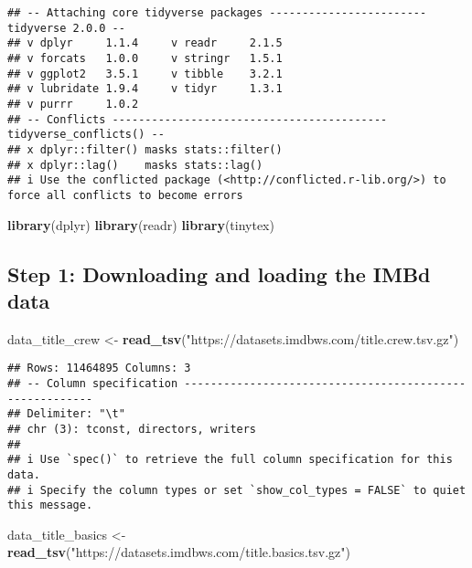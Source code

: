 \documentclass[
]{article}
\newenvironment{Shaded}{\begin{snugshade}}{\end{snugshade}}
\newcommand{\FunctionTok}[1]{\textcolor[rgb]{0.13,0.29,0.53}{\textbf{#1}}}
\newcommand{\NormalTok}[1]{#1}
\newcommand{\OtherTok}[1]{\textcolor[rgb]{0.56,0.35,0.01}{#1}}
\newcommand{\StringTok}[1]{\textcolor[rgb]{0.31,0.60,0.02}{#1}}
\begin{document}
\begin{verbatim}
## -- Attaching core tidyverse packages ------------------------ tidyverse 2.0.0 --
## v dplyr     1.1.4     v readr     2.1.5
## v forcats   1.0.0     v stringr   1.5.1
## v ggplot2   3.5.1     v tibble    3.2.1
## v lubridate 1.9.4     v tidyr     1.3.1
## v purrr     1.0.2     
## -- Conflicts ------------------------------------------ tidyverse_conflicts() --
## x dplyr::filter() masks stats::filter()
## x dplyr::lag()    masks stats::lag()
## i Use the conflicted package (<http://conflicted.r-lib.org/>) to force all conflicts to become errors
\end{verbatim}

\begin{Shaded}
\begin{Highlighting}[]
\FunctionTok{library}\NormalTok{(dplyr)}
\FunctionTok{library}\NormalTok{(readr)}
\FunctionTok{library}\NormalTok{(tinytex)}
\end{Highlighting}
\end{Shaded}

\subsection{Step 1: Downloading and loading the IMBd
data}\label{step-1-downloading-and-loading-the-imbd-data}

\begin{Shaded}
\begin{Highlighting}[]
\NormalTok{data\_title\_crew }\OtherTok{\textless{}{-}} \FunctionTok{read\_tsv}\NormalTok{(}\StringTok{"https://datasets.imdbws.com/title.crew.tsv.gz"}\NormalTok{)}
\end{Highlighting}
\end{Shaded}

\begin{verbatim}
## Rows: 11464895 Columns: 3
## -- Column specification --------------------------------------------------------
## Delimiter: "\t"
## chr (3): tconst, directors, writers
## 
## i Use `spec()` to retrieve the full column specification for this data.
## i Specify the column types or set `show_col_types = FALSE` to quiet this message.
\end{verbatim}

\begin{Shaded}
\begin{Highlighting}[]
\NormalTok{data\_title\_basics }\OtherTok{\textless{}{-}} \FunctionTok{read\_tsv}\NormalTok{(}\StringTok{"https://datasets.imdbws.com/title.basics.tsv.gz"}\NormalTok{)}
\end{Highlighting}
\end{Shaded}
\end{document}

